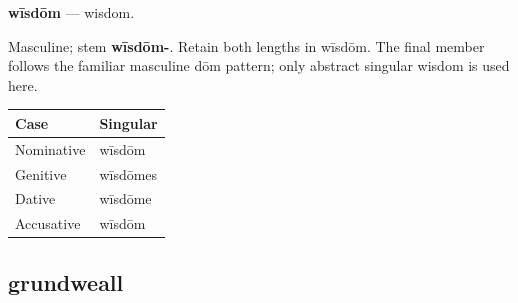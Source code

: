 \par\begin{minipage}{\linewidth}\raggedright
\textbf{wīsdōm} — wisdom.

Masculine; stem \textbf{wīsdōm-}. Retain both lengths in wīsdōm. The final member follows the familiar masculine dōm pattern; only abstract singular wisdom is used here.

\par\begingroup
\fontsize{10.5}{13.2}\selectfont
\setlength{\LTleft}{0pt}\setlength{\LTright}{\fill}
\noindent
\begin{tabular}{@{}>{\raggedright\arraybackslash}p{60.59mm}>{\raggedright\arraybackslash}p{60.59mm}@{}}
\toprule
\textbf{Case} & \textbf{Singular} \\
\midrule
Nominative & wīsdōm \\
Genitive & wīsdōmes \\
Dative & wīsdōme \\
Accusative & wīsdōm \\
\bottomrule
\end{tabular}
\par\endgroup

\end{minipage}\par
{}
\subsection*{grundweall}

